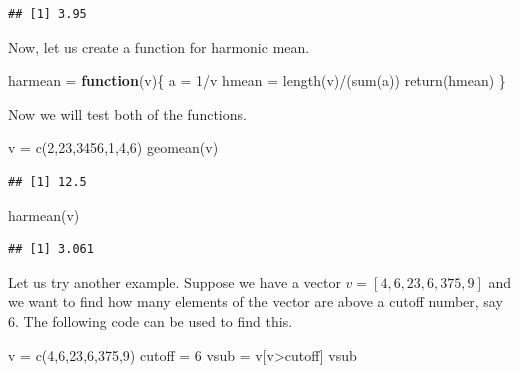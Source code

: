\documentclass[
]{article}
\newenvironment{Shaded}{\begin{snugshade}}{\end{snugshade}}
\newcommand{\ControlFlowTok}[1]{\textcolor[rgb]{0.13,0.29,0.53}{\textbf{#1}}}
\newcommand{\DecValTok}[1]{\textcolor[rgb]{0.00,0.00,0.81}{#1}}
\newcommand{\FunctionTok}[1]{\textcolor[rgb]{0.00,0.00,0.00}{#1}}
\newcommand{\NormalTok}[1]{#1}
\newcommand{\OtherTok}[1]{\textcolor[rgb]{0.56,0.35,0.01}{#1}}
\newcommand{\SpecialCharTok}[1]{\textcolor[rgb]{0.00,0.00,0.00}{#1}}
\begin{document}
\begin{verbatim}
## [1] 3.95
\end{verbatim}

Now, let us create a function for harmonic mean.

\begin{Shaded}
\begin{Highlighting}[]
\NormalTok{harmean }\OtherTok{=} \ControlFlowTok{function}\NormalTok{(v)\{}
\NormalTok{  a }\OtherTok{=} \DecValTok{1}\SpecialCharTok{/}\NormalTok{v}
\NormalTok{  hmean }\OtherTok{=} \FunctionTok{length}\NormalTok{(v)}\SpecialCharTok{/}\NormalTok{(}\FunctionTok{sum}\NormalTok{(a))}
  \FunctionTok{return}\NormalTok{(hmean)}
\NormalTok{\}}
\end{Highlighting}
\end{Shaded}

Now we will test both of the functions.

\begin{Shaded}
\begin{Highlighting}[]
\NormalTok{v }\OtherTok{=} \FunctionTok{c}\NormalTok{(}\DecValTok{2}\NormalTok{,}\DecValTok{23}\NormalTok{,}\DecValTok{3456}\NormalTok{,}\DecValTok{1}\NormalTok{,}\DecValTok{4}\NormalTok{,}\DecValTok{6}\NormalTok{)}
\FunctionTok{geomean}\NormalTok{(v)}
\end{Highlighting}
\end{Shaded}

\begin{verbatim}
## [1] 12.5
\end{verbatim}

\begin{Shaded}
\begin{Highlighting}[]
\FunctionTok{harmean}\NormalTok{(v)}
\end{Highlighting}
\end{Shaded}

\begin{verbatim}
## [1] 3.061
\end{verbatim}

Let us try another example. Suppose we have a vector
\(v = [4,6,23,6,375,9]\) and we want to find how many elements of the
vector are above a cutoff number, say 6. The following code can be used
to find this.

\begin{Shaded}
\begin{Highlighting}[]
\NormalTok{v }\OtherTok{=} \FunctionTok{c}\NormalTok{(}\DecValTok{4}\NormalTok{,}\DecValTok{6}\NormalTok{,}\DecValTok{23}\NormalTok{,}\DecValTok{6}\NormalTok{,}\DecValTok{375}\NormalTok{,}\DecValTok{9}\NormalTok{)}
\NormalTok{cutoff }\OtherTok{=} \DecValTok{6}
\NormalTok{vsub }\OtherTok{=}\NormalTok{ v[v}\SpecialCharTok{\textgreater{}}\NormalTok{cutoff]}
\NormalTok{vsub}
\end{Highlighting}
\end{Shaded}
\end{document}

